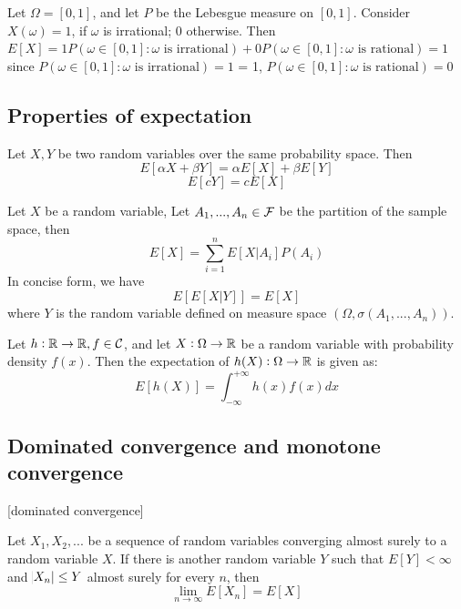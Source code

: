 \begin{refsection}
\begin{example} 
Let $\Omega=[0,1]$, and let $P$ be the Lebesgue measure on $[0,1]$. Consider $X(\omega)=1$, if $\omega$ is irrational; 0 otherwise. Then $E[X]=1 P(\omega\in[0,1]:\omega \text{ is irrational}) + 0 P(\omega\in[0,1]:\omega \text{ is rational}) = 1$
since $P(\omega\in[0,1]:\omega \text{ is irrational}) = 1$ = 1, $P(\omega\in[0,1]:\omega \text{ is rational}) = 0$ 
\end{example}

\subsection{Properties of expectation}
\begin{lemma}\label{ch:theory-of-probability:th:linearityofexpectation}
Let $X,Y$ be two random variables over the same probability space. Then
$$E[\alpha X+ \beta Y] =\alpha E[X] + \beta E[Y]$$
$$E[cY] = c E[X]$$
\end{lemma}

\begin{lemma}
Let $X$ be a random variable, Let $A_1,...,A_n \in \mathcal{F}$ be the partition of the sample space, then
$$E[X] = \sum_{i=1}^n E[X|A_i] P(A_i)$$
In concise form, we have
$$E[E[X|Y]] = E[X]$$
where $Y$ is the random variable defined on measure space $(\Omega, \sigma(A_1,...,A_n))$.
\end{lemma}


\begin{definition}\label{ch:theory-of-probability:def:expectationoffunctionofrandomvariable}
\cite{stefanica2008primer}	Let $h:\mathbb{R} \rightarrow \mathbb{R}, f\in \mathcal{C}$, and let $X: \Omega \rightarrow \mathbb{R}$ be a random variable with probability density $f(x)$. Then the expectation of $h(X):\Omega \rightarrow \mathbb{R}$ is given as:
$$E[h(X)] = \int_{-\infty}^{+\infty}h(x)f(x)dx$$
\end{definition}


\subsection{Dominated convergence and monotone convergence}[dominated convergence]
\begin{theorem}\cite[27]{shreve2004stochastic2}
Let $X_1,X_2,...$ be a sequence of random variables converging almost surely to a random variable $X$. If there is another random variable $Y$ such that $E[Y] < \infty$ and $\abs{X_n} \leq Y$ almost surely for every $n$, then 
$$\lim_{n\to \infty} E[X_n] = E[X]$$
\end{theorem}


\end{refsection}
